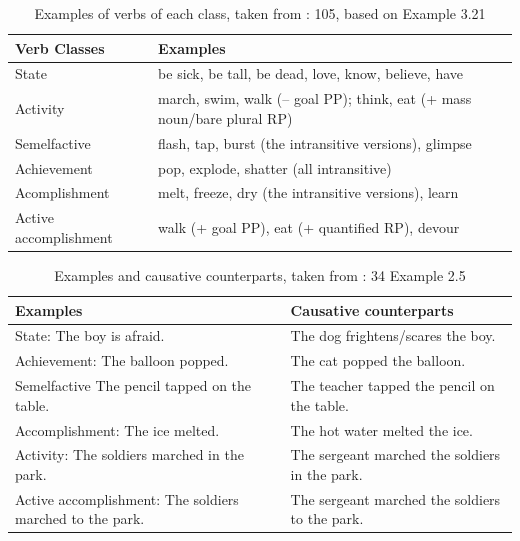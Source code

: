 \begin{table}[H]
    \centering
    \begin{tabular}{|p{3.5cm}|p{7.5cm}|} \hline 
         \textbf{Verb Classes} & \textbf{Examples}\\ \hline 
         State& be sick, be tall, be dead, love, know, believe, have\\ \hline 
         Activity& march, swim, walk (– goal PP); think, eat (+ mass noun/bare plural
RP)\\ \hline 
         Semelfactive& flash, tap, burst (the intransitive versions), glimpse\\ \hline 
         Achievement& pop, explode, shatter (all intransitive)\\ \hline 
         Acomplishment& melt, freeze, dry (the intransitive versions), learn\\ \hline 
         Active accomplishment& walk (+ goal PP), eat (+ quantified RP), devour\\ \hline
    \end{tabular}
    \caption{Examples of verbs of each class, taken from \textcite{van1997syntax}: 105, based on Example 3.21}
    \label{tab:my_label}
\end{table}



\begin{table}[H]
    \centering
    \begin{tabular}{|p{3.5cm}|p{7.5cm}|} \hline 
         Examples& Causative counterparts\\ \hline 
         State: The boy is afraid.& The dog frightens/scares the boy.\\ \hline 
         Achievement: The balloon popped.& The cat popped the balloon.\\ \hline 
         Semelfactive The pencil tapped on the table.& The teacher tapped the pencil on the table.\\ \hline 
         Accomplishment: The ice melted.& The hot water melted the ice.\\ \hline 
         Activity: The soldiers marched in the park.& The sergeant marched the soldiers in the park.\\ \hline 
         Active accomplishment: The soldiers marched to the park.& The sergeant marched the soldiers to the park.\\ \hline
    \end{tabular}
    \caption{Examples and causative counterparts, taken from \textcite{van2005exploring}: 34 Example 2.5}
    \label{tab:my_label}
\end{table}


